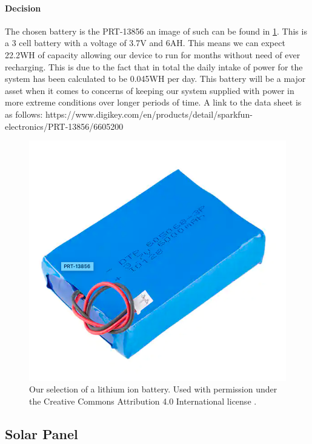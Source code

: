 \paragraph{Decision}
The chosen battery is the PRT-13856 an image of such can be found in \ref{fig:PRT-13856}. This is a 3 cell battery with a voltage of 3.7V and 6AH. This means we can expect 22.2WH of capacity allowing our device to run for months without need of ever recharging. This is due to the fact that in total the daily intake of power for the system has been calculated to be 0.045WH per day. This battery will be a major asset when it comes to concerns of keeping our system supplied with power in more extreme conditions over longer periods of time. A link to the data sheet is as follows:
https://www.digikey.com/en/products/detail/sparkfun-electronics/PRT-13856/6605200
\begin{figure}
    \centering
    \includegraphics[scale=0.4]{figures/PRT-13856.png}
    \caption{Our selection of a lithium ion battery. Used with permission under the Creative Commons Attribution 4.0 International license \cite{PRT-ref}.}
    \label{fig:PRT-13856} 
\end{figure}

\subsection{Solar Panel}

